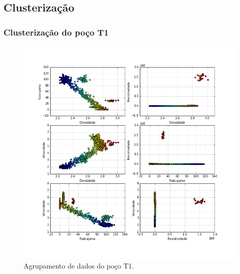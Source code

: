 \documentclass[10pt]{beamer} %
\begin{document}
\subsection{Clusterização}
\begin{frame}
	\frametitle{Clusterização do poço T1}
	\begin{figure}[H]
		\centering
			\includegraphics[scale=0.3]{Imagens/cluterpocoT1.png}
		\caption{Agrupamento de dados do poço T1.}
		\label{clusterT1}
	\end{figure} 
\end{frame}
\end{document}
